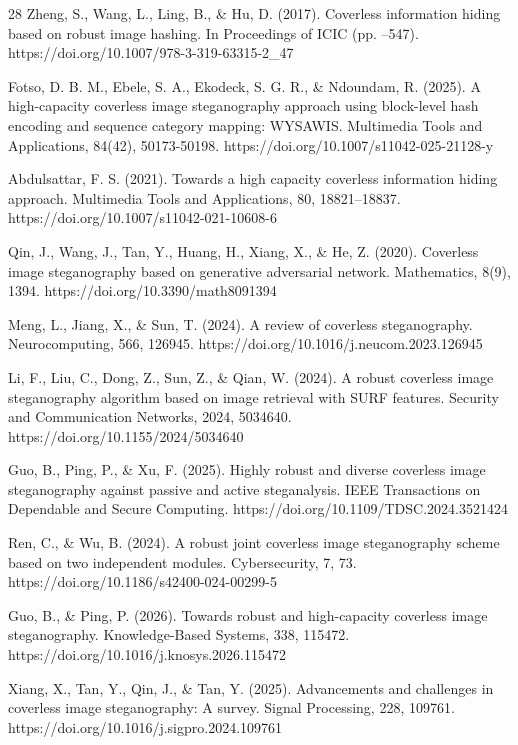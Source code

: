 \documentclass[preprint,12pt]{elsarticle}
\theoremstyle{plain}
\providecommand{\DIFaddtex}[1]{{\protect\color{blue} \sf #1}} %
\providecommand{\DIFdeltex}[1]{{\protect\color{red} \scriptsize #1}} %
\providecommand{\DIFaddbegin}{} %
\providecommand{\DIFaddend}{} %
\providecommand{\DIFdelbegin}{} %
\providecommand{\DIFdelend}{} %
\providecommand{\DIFadd}[1]{\texorpdfstring{\DIFaddtex{#1}}{#1}} %
\providecommand{\DIFdel}[1]{\texorpdfstring{\DIFdeltex{#1}}{}} %
\providecommand{\DIFscaledelfig}{0.5}
\newlength{\DIFdelgraphicswidth} %
\newlength{\DIFdelgraphicsheight} %
\providecommand{\DIFaddincludegraphics}[2][]{{\color{blue}\fbox{\DIFOincludegraphics[#1]{#2}}}} %
\providecommand{\DIFdelincludegraphics}[2][]{%
\sbox{\DIFdelgraphicsbox}{\DIFOincludegraphics[#1]{#2}}%
\settoboxwidth{\DIFdelgraphicswidth}{\DIFdelgraphicsbox} %
\settoboxtotalheight{\DIFdelgraphicsheight}{\DIFdelgraphicsbox} %
\scalebox{\DIFscaledelfig}{%
\parbox[b]{\DIFdelgraphicswidth}{\usebox{\DIFdelgraphicsbox}\\[-\baselineskip] \rule{\DIFdelgraphicswidth}{0em}}\llap{\resizebox{\DIFdelgraphicswidth}{\DIFdelgraphicsheight}{%
\setlength{\unitlength}{\DIFdelgraphicswidth}%
\begin{picture}(1,1)%
\thicklines\linethickness{2pt} %
{\color[rgb]{1,0,0}\put(0,0){\framebox(1,1){}}}%
{\color[rgb]{1,0,0}\put(0,0){\line( 1,1){1}}}%
{\color[rgb]{1,0,0}\put(0,1){\line(1,-1){1}}}%
\end{picture}%
}\hspace*{3pt}}} %
} %
\DeclareRobustCommand{\DIFaddbegin}{\DIFOaddbegin \let\includegraphics\DIFaddincludegraphics} %
\DeclareRobustCommand{\DIFaddend}{\DIFOaddend \let\includegraphics\DIFOincludegraphics} %
\DeclareRobustCommand{\DIFdelbegin}{\DIFOdelbegin \let\includegraphics\DIFdelincludegraphics} %
\DeclareRobustCommand{\DIFdelend}{\DIFOaddend \let\includegraphics\DIFOincludegraphics} %
\renewcommand{\DIFdel}[1]{}
\renewcommand{\DIFdelincludegraphics}[2][]{}
\begin{document}
\begin{thebibliography}{28}
Zheng, S., Wang, L., Ling, B., \& Hu, D. (2017). Coverless information hiding based on robust image hashing. In Proceedings of ICIC (pp. \DIFdelbegin \DIFdel{536â€“547}\DIFdelend \DIFaddbegin \DIFadd{536--547}\DIFaddend ). https://doi.org/10.1007/978-3-319-63315-2\_47

Fotso, D. B. M., Ebele, S. A., Ekodeck, S. G. R., \& Ndoundam, R. (2025). A high-capacity coverless image steganography approach using block-level hash encoding and sequence category mapping: WYSAWIS. Multimedia Tools and Applications, 84(42), 50173-50198. https://doi.org/10.1007/s11042-025-21128-y

Abdulsattar, F. S. (2021). Towards a high capacity coverless information hiding approach. Multimedia Tools and Applications, 80, 18821--18837. https://doi.org/10.1007/s11042-021-10608-6

Qin, J., Wang, J., Tan, Y., Huang, H., Xiang, X., \& He, Z. (2020). Coverless image steganography based on generative adversarial network. Mathematics, 8(9), 1394. https://doi.org/10.3390/math8091394

Meng, L., Jiang, X., \& Sun, T. (2024). A review of coverless steganography. Neurocomputing, 566, 126945. https://doi.org/10.1016/j.neucom.2023.126945

Li, F., Liu, C., Dong, Z., Sun, Z., \& Qian, W. (2024). A robust coverless image steganography algorithm based on image retrieval with SURF features. Security and Communication Networks, 2024, 5034640. https://doi.org/10.1155/2024/5034640

Guo, B., Ping, P., \& Xu, F. (2025). Highly robust and diverse coverless image steganography against passive and active steganalysis. IEEE Transactions on Dependable and Secure Computing. https://doi.org/10.1109/TDSC.2024.3521424

Ren, C., \& Wu, B. (2024). A robust joint coverless image steganography scheme based on two independent modules. Cybersecurity, 7, 73. https://doi.org/10.1186/s42400-024-00299-5

Guo, B., \& Ping, P. (2026). Towards robust and high-capacity coverless image steganography. Knowledge-Based Systems, 338, 115472. https://doi.org/10.1016/j.knosys.2026.115472


Xiang, X., Tan, Y., Qin, J., \& Tan, Y. (2025). Advancements and challenges in coverless image steganography: A survey. Signal Processing, 228, 109761. https://doi.org/10.1016/j.sigpro.2024.109761


\end{thebibliography}
\end{document}
